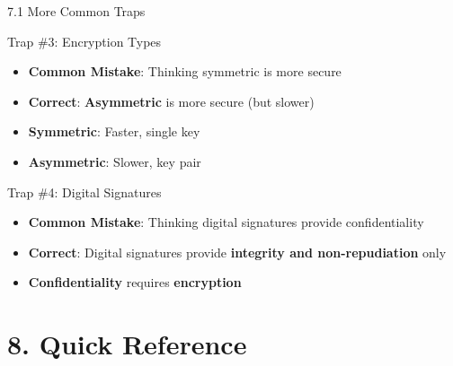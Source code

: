 \documentclass{beamer}
\begin{document}
	\begin{frame}{7.1 More Common Traps}
		\begin{block}{Trap \#3: Encryption Types}
			\begin{itemize}
				\item \textbf{Common Mistake}: Thinking symmetric is more secure
				\item \textbf{Correct}: \textbf{Asymmetric} is more secure (but slower)
				\item \textbf{Symmetric}: Faster, single key
				\item \textbf{Asymmetric}: Slower, key pair
			\end{itemize}
		\end{block}
		
		\begin{block}{Trap \#4: Digital Signatures}
			\begin{itemize}
				\item \textbf{Common Mistake}: Thinking digital signatures provide confidentiality
				\item \textbf{Correct}: Digital signatures provide \textbf{integrity and non-repudiation} only
				\item \textbf{Confidentiality} requires \textbf{encryption}
			\end{itemize}
		\end{block}
	\end{frame}
	
	\section{8. Quick Reference}
	
\end{document}
